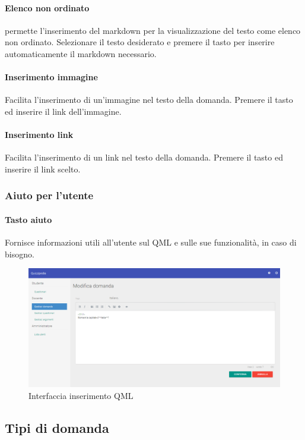 \documentclass[12pt,a4paper]{article}
\begin{document}
	\paragraph{Elenco non ordinato}permette l'inserimento del markdown per la visualizzazione del testo come elenco non ordinato. 
	Selezionare il testo desiderato e premere il tasto per inserire automaticamente il markdown necessario.

	\paragraph{Inserimento immagine}
	Facilita l'inserimento di un'immagine nel testo della domanda. Premere il tasto ed inserire il link dell'immagine.
	\paragraph{Inserimento link}
		Facilita l'inserimento di un link nel testo della domanda. Premere il tasto ed inserire il link scelto.
   \subsubsection{Aiuto per l'utente}
	\paragraph{Tasto aiuto}
	Fornisce informazioni utili all'utente sul QML e sulle sue funzionalità, in caso di bisogno.
	\begin{figure}[H]	
		\centering
		\includegraphics[width=\linewidth]{../img/screenshot/modificaDomanda.png}
		\caption{Interfaccia inserimento QML}
		\label{Interfaccia inserimento QML}
	\end{figure}
	
	
	\subsection{Tipi di domanda}
\end{document}
